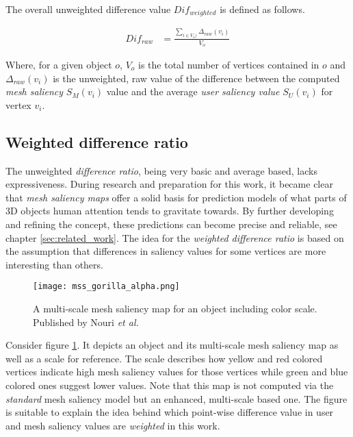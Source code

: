 The overall unweighted difference value $Dif_{weighted}$ is defined as follows.

\begin{align*}
Dif_{raw} &= \frac
	{
		\sum_{i \in V_{o})}
			\Delta_{raw}(v_i)
	}{
		V_{o}
	}
\end{align*}

Where, for a given object $o$, $V_{o}$ is the total number of vertices contained in $o$ and $\Delta_{raw}(v_i)$ is the unweighted, raw value of the difference between the computed \textit{mesh saliency} $S_{M}(v_i)$ value and the average \textit{user saliency value} $S_{U}(v_i)$ for vertex $v_i$.

		\subsection{Weighted difference ratio}
		\label{sec:weighted_difference_ratio}
The unweighted \textit{difference ratio}, being very basic and average based, lacks expressiveness. During research and preparation for this work, it became clear that \textit{mesh saliency maps} offer a solid basis for prediction models of what parts of 3D objects human attention tends to gravitate towards. By further developing and refining the concept, these predictions can become precise and reliable, see chapter \ref{sec:related_work}. The idea for the \textit{weighted difference ratio} is based on the assumption that differences in saliency values for some vertices are more interesting than others.

\begin{figure}[htb]
  \centering
  \texttt{[image: mss\_gorilla\_alpha.png]}\\ %
  \caption{A multi-scale mesh saliency map for an object including color scale. Published by Nouri \textit{et al.} \cite{nouri2015multi}}\label{fig:gorilla_saliency_map}
\end{figure}

Consider figure \ref{fig:gorilla_saliency_map}. It depicts an object and its multi-scale mesh saliency map as well as a scale for reference. The scale describes how yellow and red colored vertices indicate high mesh saliency values for those vertices while green and blue colored ones suggest lower values. Note that this map is not computed via the \textit{standard} mesh saliency model but an enhanced, multi-scale based one. The figure is suitable to explain the idea behind which point-wise difference value in user and mesh saliency values are \textit{weighted} in this work.

